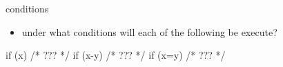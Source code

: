 \documentclass[10pt,t,svgnames]{beamer}
\begin{document}
  \begin{frame}[fragile]{conditions}
    \begin{itemize}
      \item under what conditions will each of the following be execute?
    \end{itemize}
    \begin{codeblock}
    if (x) {
      /* ??? */
    }
    if (x-y) {
      /* ??? */
    }
    if (x=y) {
      /* ??? */
    }
    \end{codeblock}

  \end{frame}
\end{document}
